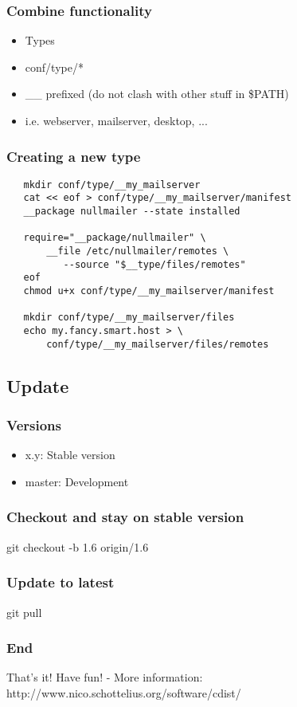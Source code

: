 \documentclass{beamer}
\begin{document}
\frame
{
  \frametitle{Combine functionality}
  \begin{itemize}
     \item Types
     \item conf/type/*
     \item \_\_ prefixed (do not clash with other stuff in \$PATH)
     \item i.e. webserver, mailserver, desktop, ...
  \end{itemize}
}
\begin{frame}[fragile]
   \frametitle{Creating a new type}
   \begin{small}
   \begin{verbatim}
   mkdir conf/type/__my_mailserver
   cat << eof > conf/type/__my_mailserver/manifest
   __package nullmailer --state installed

   require="__package/nullmailer" \
       __file /etc/nullmailer/remotes \
          --source "$__type/files/remotes"
   eof
   chmod u+x conf/type/__my_mailserver/manifest

   mkdir conf/type/__my_mailserver/files
   echo my.fancy.smart.host > \
       conf/type/__my_mailserver/files/remotes
   \end{verbatim}
   \end{small}
\end{frame}

\subsection{Update}
\begin{frame}[fragile]
  \frametitle{Versions}
  \begin{itemize}
     \item x.y: Stable version
     \item master: Development
  \end{itemize}
\end{frame}

\begin{frame}[fragile]
  \frametitle{Checkout and stay on stable version}
  \begin{center}
  git checkout -b 1.6 origin/1.6
  \end{center}
\end{frame}

\begin{frame}[fragile]
  \frametitle{Update to latest}
  \begin{center}
  git pull
  \end{center}
\end{frame}

\frame
{
  \frametitle{End}
  \begin{block}{That's it!}
  Have fun! - More information: http://www.nico.schottelius.org/software/cdist/
  \end{block}
}
\end{document}

